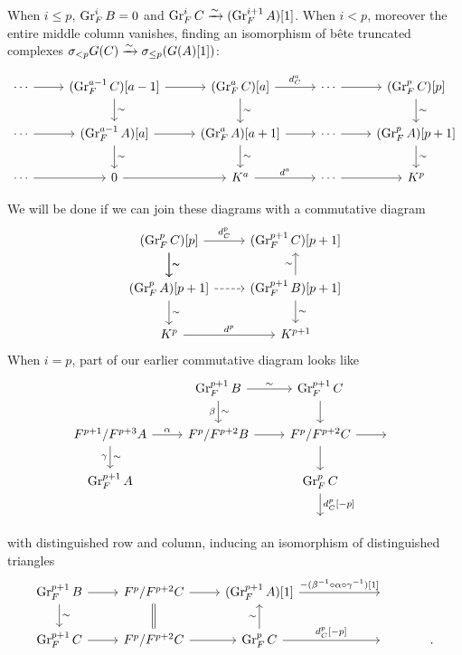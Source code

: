 \documentclass[deligne.tex]{subfiles}
\begin{document}
When $i\leq p$, $\operatorname{Gr}_F^iB=0$ and $\operatorname{Gr}^i_FC\xrightarrow\sim(\operatorname{Gr}_F^{i+1}A)[1]$.
When $i<p$, moreover the entire middle column vanishes, finding an
isomorphism of bête truncated complexes
$\sigma_{<p}G(C)\xrightarrow\sim\sigma_{\leq p}(G(A)[1])$: 
\begin{ceqn}\begin{equation*}\begin{tikzcd}
	\cdots\arrow[r]&(\Gr_F^{a-1}C)[a-1]\arrow[r]\arrow[d,"\sim"]
	&(\Gr_F^{a}C)[a]\arrow[r,"d_C^a"]\arrow[d,"\sim"]
	&\cdots\arrow[r]&(\Gr_F^{p}C)[p]\arrow[d,"\sim"] \\
	\cdots\arrow[r]&(\Gr_F^{a-1}A)[a]\arrow[r]\arrow[d,"\sim"]
	&(\Gr_F^{a}A)[a+1]\arrow[r]\arrow[d,"\sim"]
	&\cdots\arrow[r]&(\Gr_F^{p}A)[p+1]\arrow[d,"\sim"] \\
	\cdots\arrow[r]&0\arrow[r]
	&K^a\arrow[r,"{d^a}"]&\cdots\arrow[r]&K^p
\end{tikzcd}\end{equation*}\end{ceqn}
We will be done if we can join these diagrams with a commutative diagram
\begin{equation*}\begin{tikzcd}
	(\Gr_F^{p}C)[p]\arrow[d,"\sim"]\arrow[r,"d_C^p"]\arrow[d,"\sim"]
	&(\Gr_F^{p+1}C)[p+1] \\
	(\Gr_F^{p}A)[p+1]\arrow[d,"\sim"]\arrow[r,dashed]
	&(\Gr_F^{p+1}B)[p+1]\arrow[d,"\sim"]\arrow[u,"\sim"] \\
	K^p\arrow[r,"d^p"]&K^{p+1}
\end{tikzcd}\end{equation*}
When $i=p$, part of our earlier commutative diagram looks like
\begin{equation*}\begin{tikzcd}
	&\Gr_F^{p+1}B\arrow[r,"\sim"]\arrow[d,"\sim","\beta"']
	&\Gr_F^{p+1}C\arrow[d] \\
	F^{p+1}/F^{p+3}A\arrow[r,"\alpha"]\arrow[d,"\sim", "\gamma"']
	&F^p/F^{p+2}B\arrow[r]
	&F^p/F^{p+2}C\arrow[r]\arrow[d]&\; \\
	\Gr_F^{p+1}A&&\Gr_F^pC\arrow[d,"{d_C^p[-p]}"] \\ &&\;
\end{tikzcd}\end{equation*}
with distinguished row and column, inducing an isomorphism of 
distinguished triangles
\begin{equation*}\begin{tikzcd}
	\Gr^{p+1}_FB\arrow[r]\arrow[d,"\sim"]
	&F^p/F^{p+2}C\arrow[d,equals]\arrow[r]
	&(\Gr_F^{p+1}A)[1]\arrow[r,"{-(\beta^{-1}\circ\alpha\circ\gamma^{-1})[1]}"]&[40pt]\;&\; \\
	\Gr_F^{p+1}C\arrow[r]&F^p/F^{p+2}C\arrow[r]
	&\Gr_F^pC\arrow[u,"\sim"]\arrow[r,"{d_C^p[-p]}"]&\;&.
\end{tikzcd}\end{equation*}
\end{document}
